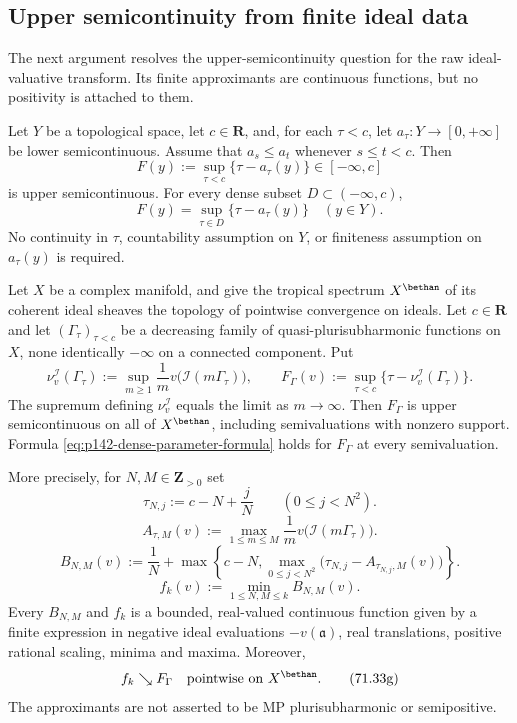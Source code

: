 \subsection{Upper semicontinuity from finite ideal data}
\label{sec:pseff-raw-usc}

The next argument resolves the upper-semicontinuity question for the raw
ideal-valuative transform.  Its finite approximants are continuous functions,
but no positivity is attached to them.

\begin{lemma}\label{lem:p142-monotone-parameter-supremum}
Let $Y$ be a topological space, let $c\in\mathbf R$, and, for each
$\tau<c$, let $a_\tau:Y\to[0,+\infty]$ be lower semicontinuous.
Assume that $a_s\leq a_t$ whenever $s\leq t<c$. Then
\[
 F(y):=\sup_{\tau<c}\{\tau-a_\tau(y)\}
 \in[-\infty,c]
\]
is upper semicontinuous. For every dense subset $D\subset(-\infty,c)$,
\[
 F(y)=\sup_{\tau\in D}\{\tau-a_\tau(y)\}
 \quad(y\in Y).
 \tag{71.33a}
 \label{eq:p142-dense-parameter-formula}
\]
No continuity in $\tau$, countability assumption on $Y$, or finiteness
assumption on $a_\tau(y)$ is required.
\end{lemma}

\begin{theorem}\label{thm:p142-raw-transform-usc}
Let $X$ be a complex manifold, and give the tropical spectrum
$X^{\bethan}$ of its coherent ideal sheaves the topology of pointwise
convergence on ideals. Let $c\in\mathbf R$ and let
$(\Gamma_\tau)_{\tau<c}$ be a
decreasing family of quasi-plurisubharmonic functions on $X$, none
identically $-\infty$ on a connected component. Put
\[
 \nu_v^{\mathcal I}(\Gamma_\tau)
 :=\sup_{m\geq1}\frac1m v\bigl(\mathcal I(m\Gamma_\tau)\bigr),
 \qquad
 F_\Gamma(v):=\sup_{\tau<c}
       \{\tau-\nu_v^{\mathcal I}(\Gamma_\tau)\}.
 \tag{71.33b}
 \label{eq:p142-raw-transform}
\]
The supremum defining $\nu_v^{\mathcal I}$ equals the limit as
$m\to\infty$. Then $F_\Gamma$ is upper semicontinuous on all of
$X^{\bethan}$, including semivaluations with nonzero support. Formula
\eqref{eq:p142-dense-parameter-formula} holds for $F_\Gamma$ at every
semivaluation.

More precisely, for $N,M\in\mathbf Z_{>0}$ set
\[
 \tau_{N,j}:=c-N+\frac jN \qquad(0\leq j<N^2).
 \tag{71.33c}
 \label{eq:p142-mesh}
\]
\[
 A_{\tau,M}(v):=\max_{1\leq m\leq M}
       \frac1m v\bigl(\mathcal I(m\Gamma_\tau)\bigr).
 \tag{71.33d}
 \label{eq:p142-finite-ideal-values}
\]
\[
 B_{N,M}(v):=\frac1N+
   \max\left\{c-N,
       \max_{0\leq j<N^2}
        \bigl(\tau_{N,j}-A_{\tau_{N,j},M}(v)\bigr)\right\}.
 \tag{71.33e}
 \label{eq:p142-upper-approximants}
\]
\[
 f_k(v):=\min_{1\leq N,M\leq k}B_{N,M}(v).
 \tag{71.33f}
 \label{eq:p142-decreasing-sequence}
\]
Every $B_{N,M}$ and $f_k$ is a bounded, real-valued continuous function
given by a finite expression in negative ideal evaluations $-v(\mathfrak a)$,
real translations, positive rational scaling, minima and maxima. Moreover,
\[
 f_k\searrow F_\Gamma\quad\hbox{pointwise on }X^{\bethan}.
 \tag{71.33g}
 \label{eq:p142-exact-sequential-limit}
\]
The approximants are not asserted to be MP plurisubharmonic or
semipositive.
\end{theorem}

